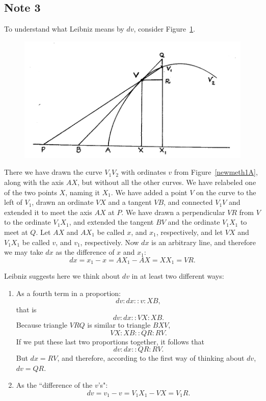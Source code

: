 \documentclass[polutonikogreek,english,twoside,openright]{article}
\begin{document}
\subsection*{Note 3}
\label{cnm3}

To understand what Leibniz means by $dv$, consider Figure~\ref{dv}.  
\begin{figure}[htp]
\begin{center}
\includegraphics[width=.75\textwidth]{fig/Figure3}
\caption{}
\label{dv}
\vspace{-10pt}
\end{center}
\end{figure}
There we have drawn the curve $V_1V_2$ with ordinates $v$ from
Figure~\ref{newmeth1A}, along with the axis $AX$, but without all the
other curves.  We have relabeled one of the two points $X$, naming it
$X_1$.  We have added a point $V$ on the curve to the left of $V_1$,
drawn an ordinate $VX$ and a tangent $VB$, and connected $V_1V$ and
extended it to meet the axis $AX$ at $P$.  We have drawn a
perpendicular $VR$ from $V$ to the ordinate $V_1X_1$, and extended the
tangent $BV$ and the ordinate $V_1X_1$ to meet at $Q$.  Let $AX$ and
$AX_1$ be called $x$, and $x_1$, respectively, and let $VX$ and
$V_1X_1$ be called $v$, and $v_1$, respectively.  Now $dx$ is an
arbitrary line, and therefore we may take $dx$ as the difference of
$x$ and $x_1$:
$$dx = x_1 -x = AX_1 - AX = XX_1 = VR.$$

Leibniz suggests here we think about $dv$ in at least two different ways:
\begin{enumerate}
\item As a fourth term in a proportion:
$$dv\!:\!dx :: v \!:\! XB,$$ 
that is
$$dv\!:\!dx :: VX \!:\! XB.$$
Because triangle $VRQ$ is similar to triangle $BXV$,
$$ VX \!:\! XB :: QR\!:\!RV.$$
If we put these last two proportions together, it follows that
$$dv\!:\!dx :: QR\!:\!RV.$$
But $dx = RV$, and therefore, according to the first way of thinking about $dv$, $dv = QR$.

\item As the ``difference of the $v$'s":
$$dv  = v_1 - v = V_1X_1 - VX = V_1R.$$
\end{enumerate}
\end{document}
